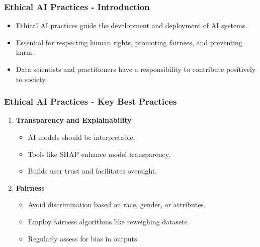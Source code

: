 \documentclass[aspectratio=169]{beamer}
\begin{document}
\begin{frame}[fragile]
    \frametitle{Ethical AI Practices - Introduction}
    \begin{itemize}
        \item Ethical AI practices guide the development and deployment of AI systems.
        \item Essential for respecting human rights, promoting fairness, and preventing harm.
        \item Data scientists and practitioners have a responsibility to contribute positively to society.
    \end{itemize}
\end{frame}

\begin{frame}[fragile]
    \frametitle{Ethical AI Practices - Key Best Practices}
    \begin{enumerate}
        \item \textbf{Transparency and Explainability}
            \begin{itemize}
                \item AI models should be interpretable.
                \item Tools like SHAP enhance model transparency.
                \item Builds user trust and facilitates oversight.
            \end{itemize}
        
        \item \textbf{Fairness}
            \begin{itemize}
                \item Avoid discrimination based on race, gender, or attributes.
                \item Employ fairness algorithms like reweighing datasets.
                \item Regularly assess for bias in outputs.
            \end{itemize}
    \end{enumerate}
\end{frame}
\end{document}
